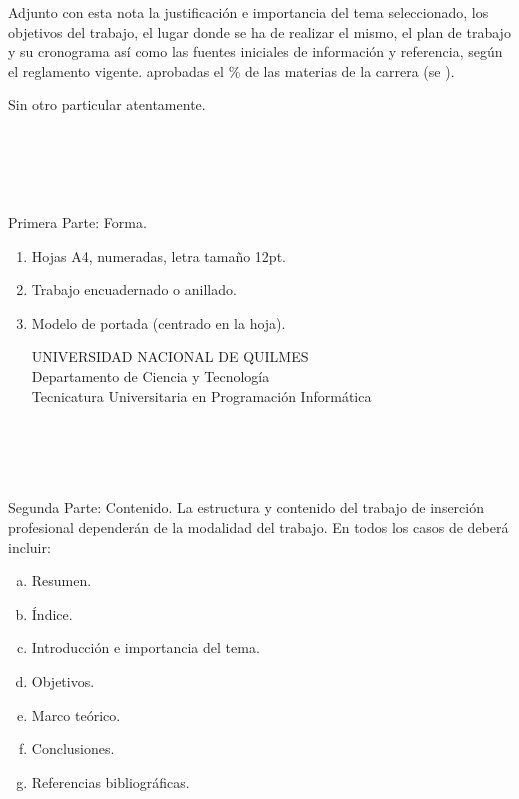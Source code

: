 Adjunto con esta nota la justificación e importancia del tema
seleccionado, los objetivos del trabajo, el lugar donde se ha de realizar el
mismo, el plan de trabajo y su cronograma así como las fuentes iniciales de
información y referencia, según el reglamento vigente. 
aprobadas el \%  de las materias de la carrera (se
).

Sin otro particular  atentamente.\\ \\
\\
\\
\\
\\

\newpage
{}
Primera Parte: Forma.
\begin{enumerate}
\item Hojas A4, numeradas, letra tamaño 12pt.
\item Trabajo encuadernado o anillado.
\item Modelo de portada (centrado en la hoja).
\begin{center}
UNIVERSIDAD NACIONAL DE QUILMES\\
Departamento de Ciencia y Tecnología\\
Tecnicatura Universitaria en Programación Informática\\

\\
\\
\\
\\
\end{center}
\end{enumerate}

Segunda Parte: Contenido.
La estructura y contenido del trabajo de inserción profesional dependerán de la
modalidad del trabajo. En todos los casos de deberá incluir:
\begin{enumerate}[a.]
\item Resumen.
\item Índice.
\item Introducción e importancia del tema.
\item Objetivos.
\item Marco teórico.
\item Conclusiones.
\item Referencias bibliográficas.
\end{enumerate}

